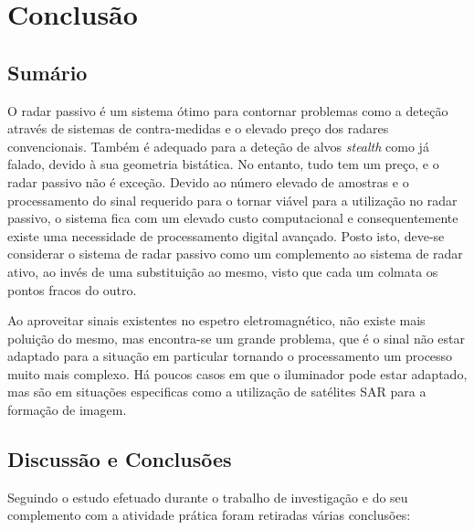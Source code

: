 
\chapter{Conclusão} %
\label{chap:Chapter6} %

\section{Sumário}
O radar passivo é um sistema ótimo para contornar problemas como a deteção através de sistemas de contra-medidas e o elevado preço dos radares convencionais. Também é adequado para a deteção de alvos \textit{stealth} como já falado, devido à sua geometria bistática. No entanto, tudo tem um preço, e o radar passivo não é exceção. Devido ao número elevado de amostras e o processamento do sinal requerido para o tornar viável para a utilização no radar passivo, o sistema fica com um elevado custo computacional e consequentemente existe uma necessidade de processamento digital avançado. Posto isto, deve-se considerar o sistema de radar passivo como um complemento ao sistema de radar ativo, ao invés de uma substituição ao mesmo, visto que cada um colmata os pontos fracos do outro.\par 
Ao aproveitar sinais existentes no espetro eletromagnético, não existe mais poluição do mesmo, mas encontra-se um grande problema, que é o sinal não estar adaptado para a situação em particular tornando o processamento um processo muito mais complexo. Há poucos casos em que o iluminador pode estar adaptado, mas são em situações especificas como a utilização de satélites \gls{SAR} para a formação de imagem.\par 


\section{Discussão e Conclusões}
Seguindo o estudo efetuado durante o trabalho de investigação e do seu complemento com a atividade prática foram retiradas várias conclusões:


